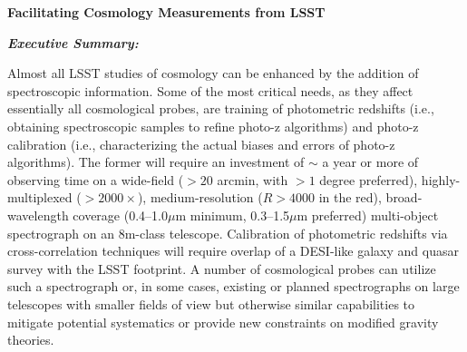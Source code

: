 \documentclass[12pt]{report}
\begin{document}
\pagestyle{fancy}
\fancyfoot{}%
\fancyfoot[R]{\thepage}  %

\fancyhead[R]{}
\renewcommand{\footrulewidth}{1pt}


\begin{centering}
{\huge{\bf{{Facilitating Cosmology Measurements from LSST}}}}


{\it{\bf Executive Summary:}}
\end{centering}
%

Almost all LSST studies of cosmology can be enhanced by the addition of spectroscopic information.  Some of the most critical needs, as they affect essentially all cosmological probes, are training of photometric redshifts (i.e., obtaining spectroscopic samples to refine photo-z algorithms) and photo-z calibration (i.e., characterizing the actual biases and errors of photo-z algorithms).  The former will require an investment of $\sim$ a year or more of observing time on a wide-field ($>20$ arcmin, with $>1$ degree preferred), highly-multiplexed ($>2000\times$), medium-resolution ($R>4000$ in the red), broad-wavelength coverage (0.4--1.0$\mu$m minimum, 0.3--1.5$\mu$m preferred) multi-object spectrograph on an 8m-class telescope.  Calibration of photometric redshifts via cross-correlation techniques will require overlap of a DESI-like galaxy and quasar survey with the LSST footprint.  A number of cosmological probes can utilize such a spectrograph or, in some cases, existing or planned spectrographs on large telescopes with smaller fields of view but otherwise similar capabilities to mitigate potential systematics or provide new constraints on modified gravity theories.
\end{document}
